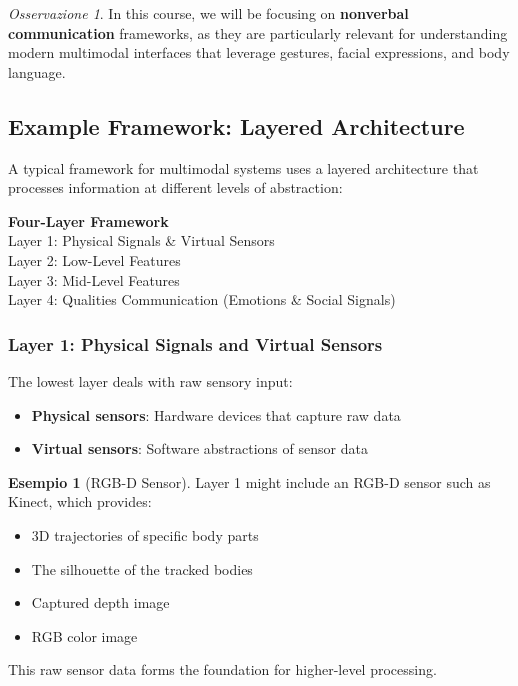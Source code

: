 \documentclass[11pt,a4paper]{article}
\theoremstyle{definition}
\newtheorem{example}{Esempio}[section]
\theoremstyle{plain}
\theoremstyle{remark}
\newtheorem*{observation}{Osservazione}
\begin{document}
\begin{observation}
In this course, we will be focusing on \textbf{nonverbal communication} frameworks, as they are particularly relevant for understanding modern multimodal interfaces that leverage gestures, facial expressions, and body language.
\end{observation}

\subsection{Example Framework: Layered Architecture}

A typical framework for multimodal systems uses a layered architecture that processes information at different levels of abstraction:

\begin{center}
\colorbox{teal!15}{\parbox{0.9\textwidth}{
\centering
\textbf{Four-Layer Framework}\\[0.2cm]
Layer 1: Physical Signals \& Virtual Sensors\\
Layer 2: Low-Level Features\\
Layer 3: Mid-Level Features\\
Layer 4: Qualities Communication (Emotions \& Social Signals)
}}
\end{center}

\subsubsection{Layer 1: Physical Signals and Virtual Sensors}

The lowest layer deals with raw sensory input:

\begin{itemize}
    \item \textbf{Physical sensors}: Hardware devices that capture raw data
    \item \textbf{Virtual sensors}: Software abstractions of sensor data
\end{itemize}

\begin{example}[RGB-D Sensor]
Layer 1 might include an RGB-D sensor such as Kinect, which provides:
\begin{itemize}
    \item 3D trajectories of specific body parts
    \item The silhouette of the tracked bodies
    \item Captured depth image
    \item RGB color image
\end{itemize}

This raw sensor data forms the foundation for higher-level processing.
\end{example}
\end{document}
